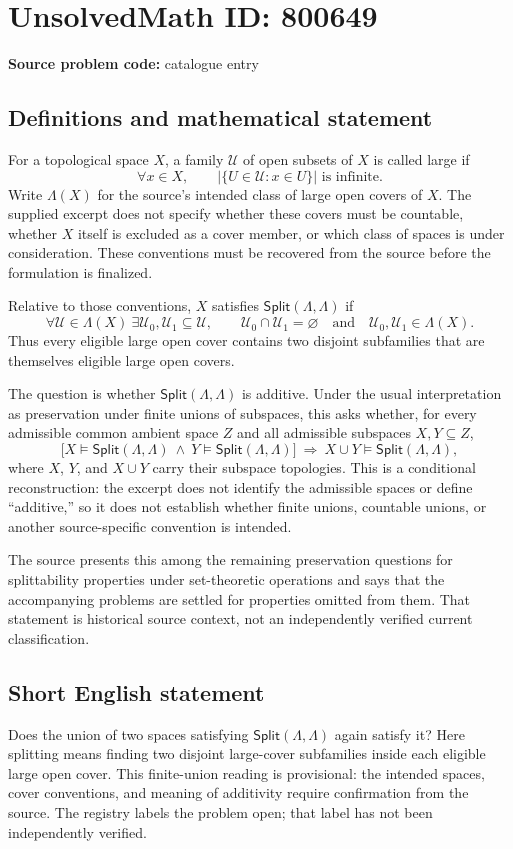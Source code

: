 \documentclass[11pt]{article}
\begin{document}
\section*{UnsolvedMath ID: 800649}
\textbf{Source problem code:} catalogue entry
\subsection{Definitions and mathematical statement}
For a topological space \(X\), a family \(\mathcal U\) of open subsets of \(X\) is called large if
\[
\forall x\in X,\qquad \bigl|\{U\in\mathcal U:x\in U\}\bigr|\text{ is infinite}.
\]
Write \(\Lambda(X)\) for the source's intended class of large open covers of \(X\). The supplied excerpt does not specify whether these covers must be countable, whether \(X\) itself is excluded as a cover member, or which class of spaces is under consideration. These conventions must be recovered from the source before the formulation is finalized.

Relative to those conventions, \(X\) satisfies \(\mathsf{Split}(\Lambda,\Lambda)\) if
\[
\forall\mathcal U\in\Lambda(X)\ \exists\mathcal U_0,\mathcal U_1\subseteq\mathcal U,
\qquad
\mathcal U_0\cap\mathcal U_1=\varnothing
\quad\text{and}\quad
\mathcal U_0,\mathcal U_1\in\Lambda(X).
\]
Thus every eligible large open cover contains two disjoint subfamilies that are themselves eligible large open covers.

The question is whether \(\mathsf{Split}(\Lambda,\Lambda)\) is additive. Under the usual interpretation as preservation under finite unions of subspaces, this asks whether, for every admissible common ambient space \(Z\) and all admissible subspaces \(X,Y\subseteq Z\),
\[
\bigl[X\models\mathsf{Split}(\Lambda,\Lambda)
\ \land\ Y\models\mathsf{Split}(\Lambda,\Lambda)\bigr]
\ \Longrightarrow\
X\cup Y\models\mathsf{Split}(\Lambda,\Lambda),
\]
where \(X\), \(Y\), and \(X\cup Y\) carry their subspace topologies. This is a conditional reconstruction: the excerpt does not identify the admissible spaces or define ``additive,'' so it does not establish whether finite unions, countable unions, or another source-specific convention is intended.

The source presents this among the remaining preservation questions for splittability properties under set-theoretic operations and says that the accompanying problems are settled for properties omitted from them. That statement is historical source context, not an independently verified current classification.
\subsection{Short English statement}
Does the union of two spaces satisfying \(\mathsf{Split}(\Lambda,\Lambda)\) again satisfy it? Here splitting means finding two disjoint large-cover subfamilies inside each eligible large open cover. This finite-union reading is provisional: the intended spaces, cover conventions, and meaning of additivity require confirmation from the source. The registry labels the problem open; that label has not been independently verified.
\end{document}
